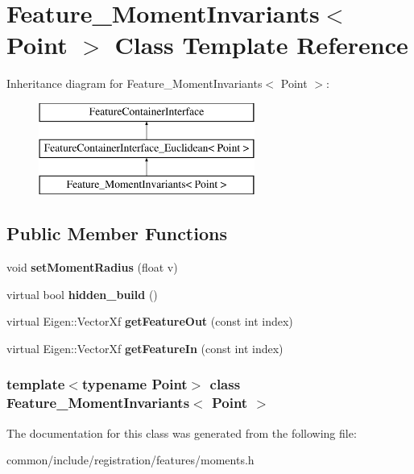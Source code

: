 \hypertarget{classFeature__MomentInvariants}{
\section{Feature\_\-MomentInvariants$<$ Point $>$ Class Template Reference}
\label{classFeature__MomentInvariants}
}
Inheritance diagram for Feature\_\-MomentInvariants$<$ Point $>$:\begin{figure}[H]
\begin{center}
\leavevmode
\includegraphics[height=3.000000cm]{classFeature__MomentInvariants}
\end{center}
\end{figure}
\subsection*{Public Member Functions}
\begin{DoxyCompactItemize}
\item 
\hypertarget{classFeature__MomentInvariants_a91c74d851f3da794c382b5e26bb63459}{
void {\bfseries setMomentRadius} (float v)}
\label{classFeature__MomentInvariants_a91c74d851f3da794c382b5e26bb63459}

\item 
\hypertarget{classFeature__MomentInvariants_a813a34ed8a871498bfec8a637345078e}{
virtual bool {\bfseries hidden\_\-build} ()}
\label{classFeature__MomentInvariants_a813a34ed8a871498bfec8a637345078e}

\item 
\hypertarget{classFeature__MomentInvariants_a0a6e40c2a445860db9b8e64807d21e8d}{
virtual Eigen::VectorXf {\bfseries getFeatureOut} (const int index)}
\label{classFeature__MomentInvariants_a0a6e40c2a445860db9b8e64807d21e8d}

\item 
\hypertarget{classFeature__MomentInvariants_a23769a6e06127a376360deae3e405d83}{
virtual Eigen::VectorXf {\bfseries getFeatureIn} (const int index)}
\label{classFeature__MomentInvariants_a23769a6e06127a376360deae3e405d83}

\end{DoxyCompactItemize}
\subsubsection*{template$<$typename Point$>$ class Feature\_\-MomentInvariants$<$ Point $>$}



The documentation for this class was generated from the following file:\begin{DoxyCompactItemize}
\item 
common/include/registration/features/moments.h\end{DoxyCompactItemize}
